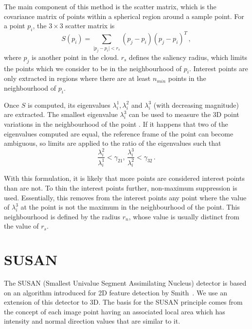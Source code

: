 \documentclass[11pt,a4paper]{kth-mag}
\begin{document}
The main component of this method is the scatter matrix, which is the covariance
matrix of points within a spherical region around a sample point. For a point
$p_i$, the $3\times 3$ scatter matrix is
\begin{equation}
  \label{eq:4}
  S(p_i)=\sum_{\mid p_j - p_i \mid < r_s}(p_j-p_i)(p_j-p_i)^T\,,
\end{equation}
where $p_j$ is another point in the cloud. $r_s$ defines the saliency radius,
which limits the points which we consider to be in the neighbourhood of $p_i$.
Interest points are only extracted in regions where there are at least $n_{min}$
points in the neighbourhood of $p_i$.

Once $S$ is computed, its eigenvalues $\lambda^1_i, \lambda^2_i$ and
$\lambda^3_i$ (with decreasing magnitude) are extracted. The smallest eigenvalue
$\lambda^3_i$ can be used to measure the 3D point variations in the
neighbourhood of the point \cite{zhong2009intrinsic}. If it happens that two of
the eigenvalues computed are equal, the reference frame of the point can become
ambiguous, so limits are applied to the ratio of the eigenvalues such that
\begin{equation}
  \label{eq:8}
  \frac{\lambda^2_i}{\lambda^1_i}< \gamma_{21},\, \frac{\lambda^3_i}{\lambda^2_i}< \gamma_{32}\,.
\end{equation}

With this formulation, it is likely that more points are considered interest
points than are not. To thin the interest points further, non-maximum
suppression is used. Essentially, this removes from the interest points any
point where the value of $\lambda^3_i$ at the point is not the maximum in the
neighbourhood of the point. This neighbourhood is defined by the radius $r_{n}$,
whose value is usually distinct from the value of $r_s$.
\section{SUSAN}
The SUSAN (Smallest Univalue Segment Assimilating Nucleus) detector is based on
an algorithm introduced for 2D feature detection by Smith~\cite{smith1997susan}.
We use an extension of this detector to 3D. The basis for the SUSAN principle
comes from the concept of each image point having an associated local area which
has intensity and normal direction values that are similar to it.
\end{document}
